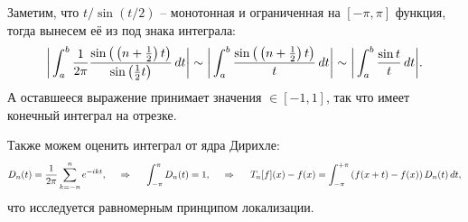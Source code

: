 \begin{uproof}
    Заметим, что $t/\sin(t/2)$ -- монотонная и ограниченная на $[-\pi, \pi]$ функция, тогда вынесем её из под знака интеграла:
    \begin{equation*}
        \bigg| \int_{a}^{b} \frac{1}{2\pi} \frac{\sin \big(\left(n+\frac{1}{2}\right) t\big)}{\sin\left(\frac{1}{2} t\right)} \, d t \bigg| \sim
        \bigg|
           \int_a^b \frac{\sin \big(\left(n+\frac{1}{2}\right) t\big)}{t} \, d t 
        \bigg| \sim 
        \bigg|
            \int_{a}^{b}  \frac{\sin t}{t} \, d t
        \bigg|.
    \end{equation*}
    А оставшееся выражение принимает значения $\in [-1, 1]$, так что имеет конечный интеграл на отрезке.  
\end{uproof}

Также можем оценить интеграл от ядра Дирихле:
\begin{equation*}
    D_n (t) = \frac{1}{2\pi} \sum_{k=-n}^{n} e^{-ikt},
    \hspace{0.5cm} \Rightarrow \hspace{0.5cm}
    \int_{-\pi}^{\pi} D_n (t) = 1,
    \hspace{0.5cm} \Rightarrow \hspace{0.5cm}
    T_n[f](x) - f(x) = \int_{-\pi}^{+\pi} \left(
        f(x+t) -f(x)
    \right) D_n(t) \, d t,
\end{equation*}
что исследуется равномерным принципом локализации.